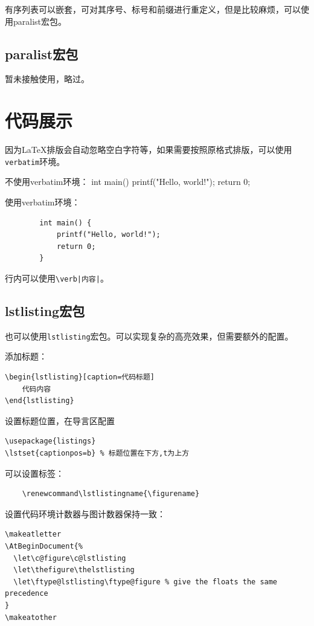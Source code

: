 有序列表可以嵌套，可对其序号、标号和前缀进行重定义，但是比较麻烦，可以使用paralist宏包。


\subsection{paralist宏包}\label{subsec:paralist}

暂未接触使用，略过。

\section{代码展示}\label{sec:codeshow}

因为\LaTeX{}排版会自动忽略空白字符等，如果需要按照原格式排版，可以使用\lstinline{verbatim}环境。


\begin{codeshow}
    不使用verbatim环境：
    int main() {
            printf("Hello, world!");
            return 0;
        }

    使用verbatim环境：
    \begin{verbatim}
        int main() {
            printf("Hello, world!");
            return 0;
        }
    \end{verbatim}
\end{codeshow}

行内可以使用\lstinline{\verb|内容|}。

\subsection{lstlisting宏包}\label{subsec:lstlistings}

也可以使用\lstinline{lstlisting}宏包。可以实现复杂的高亮效果，但需要额外的配置。

添加标题：
\begin{verbatim}
\begin{lstlisting}[caption=代码标题]
    代码内容
\end{lstlisting}
\end{verbatim}

设置标题位置，在导言区配置
\begin{lstlisting}
\usepackage{listings}
\lstset{captionpos=b} % 标题位置在下方,t为上方
\end{lstlisting}

可以设置标签：
\begin{lstlisting}
    \renewcommand\lstlistingname{\figurename}
\end{lstlisting}

设置代码环境计数器与图计数器保持一致：
\begin{lstlisting}
\makeatletter
\AtBeginDocument{%
  \let\c@figure\c@lstlisting
  \let\thefigure\thelstlisting
  \let\ftype@lstlisting\ftype@figure % give the floats the same precedence
}
\makeatother
\end{lstlisting}


